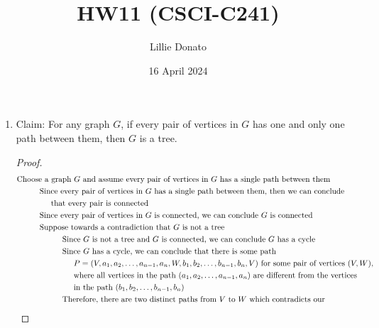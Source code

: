 \documentclass{article}
\title{HW11 (CSCI-C241)}
\author{Lillie Donato}
\date{16 April 2024}
\begin{document}
\maketitle

\begin{enumerate}
    \item Claim: For any graph $G$, if every pair of vertices in $G$ has one and only one path between them, then $G$ is a tree.
    \begin{proof}
        \begin{align}
            &\text{Choose a graph } G \text{ and assume every pair of vertices in } G \text{ has a single path between them} \\
            &\hspace{1cm} \text{Since every pair of vertices in } G \text{ has a single path between them, then we can conclude} \\
            &\hspace{1.5cm} \text{that every pair is connected} \nonumber \\
            &\hspace{1cm} \text{Since every pair of vertices in } G \text{ is connected, we can conclude } G \text{ is connected} \\
            &\hspace{1cm} \text{Suppose towards a contradiction that } G \text{ is not a tree} \\
            &\hspace{2cm} \text{Since } G \text{ is not a tree and } G \text{ is connected, we can conclude } G \text{ has a cycle} \\
            &\hspace{2cm} \text{Since } G \text{ has a cycle, we can conclude that there is some path } \\
            &\hspace{2.5cm} P = (V, a_1, a_2, \dots, a_{n-1}, a_n, W, b_1, b_2, \dots, b_{n-1}, b_n, V) \text{ for some pair of vertices } (V,W), \nonumber \\
            &\hspace{2.5cm} \text{where all vertices in the path } (a_1, a_2, \dots, a_{n-1}, a_n) \text{ are different from the vertices} \nonumber \\
            &\hspace{2.5cm} \text{in the path } (b_1, b_2, \dots, b_{n-1}, b_n) \\
            &\hspace{2cm} \text{Therefore, there are two distinct paths from $V$ to $W$ which contradicts our} \\

\end{align}
\end{proof}
\end{enumerate}
\end{document}
